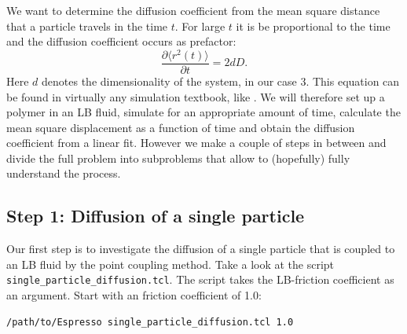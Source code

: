 We want to determine the diffusion coefficient from the mean square
distance that a particle travels in the time $t$. For large $t$ it is
be proportional to the time and the diffusion coefficient occurs as 
prefactor: 
\begin{equation}
  \frac{\partial \langle r^2 \left(t\right)\rangle}{\partial t} = 2 d D. 
  \label{eq:msd}
\end{equation}
Here $d$ denotes the dimensionality of the system, in our case 3.
This equation can be found in virtually any simulation textbook, like
\cite{frenkel02b}.
We will therefore set up a polymer in an LB fluid, simulate for an appropriate
amount of time, calculate the mean square displacement as a function of
time and obtain the diffusion coefficient from a linear fit. However
we make a couple of steps in between and divide the full problem into 
subproblems that allow to (hopefully) fully understand the process.

\subsection{Step 1: Diffusion of a single particle}
Our first step is to investigate the diffusion of a single particle
that is coupled to an LB fluid by the point coupling method.
Take a look at the script \texttt{single\_particle\_diffusion.tcl}.
The script takes the LB-friction coefficient as an argument. Start with
an friction coefficient of 1.0:
{\vspace{0,2cm}\small
\begin{lstlisting}[numbers=none]
/path/to/Espresso single_particle_diffusion.tcl 1.0
\end{lstlisting}
\vspace{0,2cm}
}


